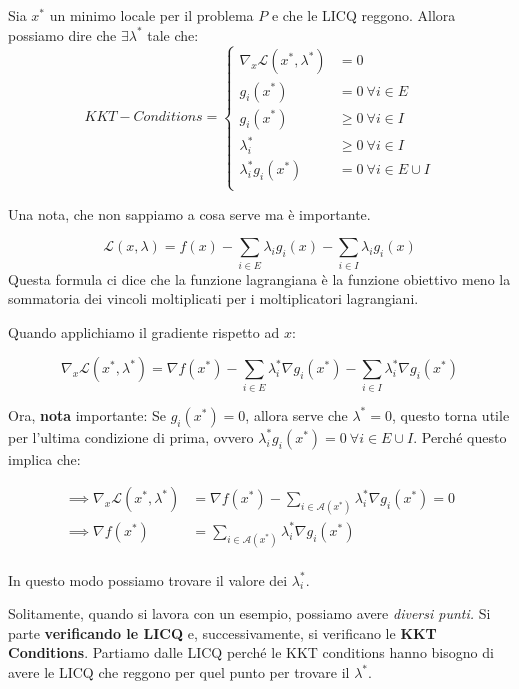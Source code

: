 Sia $x^*$ un minimo locale per il problema $P$ e che le LICQ reggono. Allora possiamo dire che 
$\exists \lambda^*$ tale che:
$$
KKT-Conditions = \begin{cases}
    \nabla_x \mathcal{L}(x^*, \lambda^*) & = 0 \\
    g_i(x^*) & = 0 \ \forall i \in E \\
    g_i(x^*) & \geq 0 \ \forall i \in I \\
    \lambda_i^* & \geq 0 \ \forall i \in I \\
    \lambda_i^* g_i(x^*) & = 0 \ \forall i \in E \cup I \\
\end{cases}
$$

Una nota, che non sappiamo a cosa serve ma è importante.

$$
\mathcal{L}(x, \lambda) = f(x) - \sum_{i \in E} \lambda_i g_i(x) - \sum_{i \in I} \lambda_i g_i(x)
$$
Questa formula ci dice che la funzione lagrangiana è la funzione obiettivo meno la sommatoria dei vincoli moltiplicati per i moltiplicatori lagrangiani.

Quando applichiamo il gradiente rispetto ad $x$:

$$
\nabla_x \mathcal{L}(x^*, \lambda^*) = \nabla f(x^*) - \sum_{i \in E} \lambda_i^* \nabla g_i(x^*) - \sum_{i \in I} \lambda_i^* \nabla g_i(x^*)
$$

Ora, \textbf{nota} importante: Se $g_i(x^*) = 0$, allora serve che $\lambda^*=0$, questo torna utile 
per l'ultima condizione di prima, ovvero $\lambda_i^* g_i(x^*) = 0 \ \forall i \in E \cup I$.
Perché questo implica che:

\begin{equation}
    \begin{aligned}
        \implies \nabla_x \mathcal{L}(x^*, \lambda^*) & = \nabla f(x^*) - \sum_{i \in \mathcal{A}(x^*)} \lambda_i^* \nabla g_i(x^*) = 0 \\
        \implies \nabla f(x^*) & = \sum_{i \in \mathcal{A}(x^*)} \lambda_i^* \nabla g_i(x^*) \\
    \end{aligned}
\end{equation}

In questo modo possiamo trovare il valore dei $\lambda_i^*$.

Solitamente, quando si lavora con un esempio, possiamo avere\textit{ diversi punti.} Si parte \textbf{verificando le LICQ} e, successivamente,
si verificano le \textbf{KKT Conditions}. Partiamo dalle LICQ perché le KKT conditions 
hanno bisogno di avere le LICQ che reggono per quel punto per trovare il $\lambda^*$.

